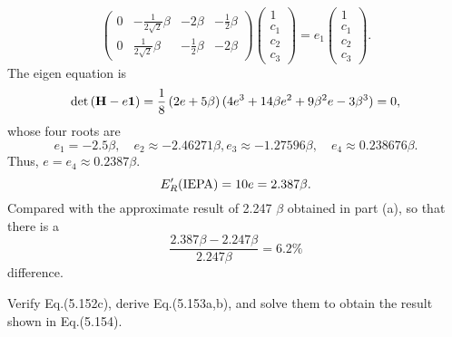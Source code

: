 \documentclass[a4paper]{book}
\newcounter{exercise}[chapter]
\newcounter{solution}[chapter]
\renewcommand\det[1]{{\rm det}\left(#1\right)}
\newcommand{\HH}{{\bf H}}
\newcommand{\I}{{\bf 1}}
\begin{document}
\begin{solution}
\begin{itemize}
\[\begin{pmatrix}
			0 & -\frac{1}{2\sqrt{2}} \beta & -2\beta & -\frac{1}{2} \beta \\
			0 & \frac{1}{2\sqrt{2}} \beta & -\frac{1}{2} \beta & -2\beta 
		\end{pmatrix} \begin{pmatrix}
			1 \\ c_1 \\ c_2 \\ c_3
		\end{pmatrix} = e_1 \begin{pmatrix}
			1 \\ c_1 \\ c_2 \\ c_3
		\end{pmatrix} .
	\]
	The eigen equation is
	\[
		\det{\HH - e \I} = \frac{1}{8} \left( 2e + 5 \beta \right) ( 4 e^3 + 14 \beta e^2 + 9 \beta^2 e - 3 \beta^3 ) = 0,
	\]
	whose four roots are
	\[
		e_1 = -2.5 \beta , \quad e_2 \approx -2.46271 \beta , e_3 \approx -1.27596 \beta , \quad e_4 \approx 0.238676 \beta.
	\]
	Thus, $e = e_4 \approx 0.2387 \beta.$
	\[
		E^\prime_R({\rm IEPA}) = 10 e = 2.387 \beta.
	\]
	Compared with the approximate result of 2.247 $\beta$ obtained in part (a), so that there is a
	\[
		\frac{ 2.387 \beta - 2.247 \beta }{ 2.247 \beta } = 6.2 \%
	\]
	 difference.
	 
	\end{itemize}		
	
	\end{solution}
	
	\begin{exercise}
	Verify Eq.(5.152c), derive Eq.(5.153a,b), and solve them to obtain the result shown in Eq.(5.154).
	\end{exercise}
	
\end{document}
